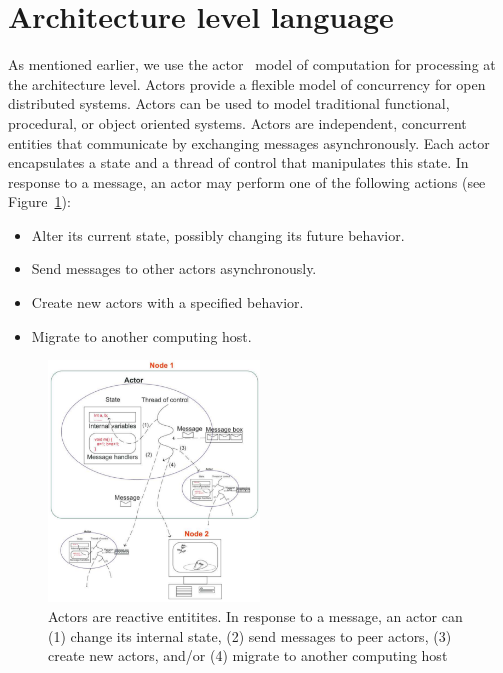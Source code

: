 \documentclass[a4paper]{article}
\begin{document}
\section{Architecture level language}
As mentioned earlier, we use the actor~\cite{actors} model of computation for processing at the architecture level. Actors provide a flexible model of concurrency for open distributed systems. Actors can be used to model traditional functional, procedural, or object oriented systems. Actors are independent, concurrent entities that communicate by exchanging messages asynchronously. Each actor encapsulates a state and a thread
of control that manipulates this state. In response to a message, an  actor may perform one of the following actions (see Figure~\ref{fig:actors}):
\begin{itemize}
\item Alter its current state, possibly changing its future behavior.
\item Send messages to other actors asynchronously.
\item Create new actors with a specified behavior.
\item Migrate to another computing host.
\end{itemize}

\begin{figure}
\centering
\includegraphics[width=0.5\textwidth]{Actors.png}
\caption{\label{fig:actors}Actors are reactive entitites. In response to a message, an actor can (1) change its internal state, (2) send messages to peer actors, (3) create new actors, and/or (4) migrate to another computing host}
\end{figure}
\end{document}
